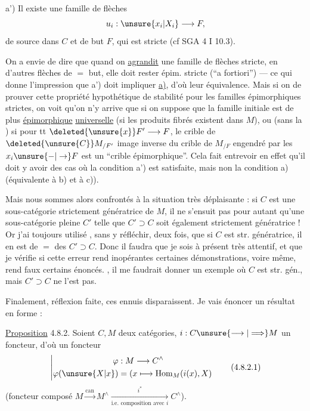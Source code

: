 a') Il existe une famille de flèches
\[
u_i:\unsure{x_i|X_i}\longrightarrow F,
\]
de source dans $C$ et
de but $F$, qui est 
stricte (cf SGA 4 I 10.3).

On a envie de dire que quand on \uline{agrandit}
une famille de flèches 
stricte, en   d'autres flèches de
$=$ but, elle doit rester épim.
stricte (``a fortiori'') --- ce qui donne
l'impression que a') doit impliquer \uline{a)},
d'où leur  équivalence. Mais si on  de prouver cette propriété hypothétique 
de stabilité pour les familles épimorphiques
strictes, on voit qu'on n'y arrive que
si on suppose que la famille initiale
est de plus \uline{épimorphique} \uline{universelle}
(si les produits fibrés existent dans $M$),
ou (sans la  ) si  pour
tt $\deleted{\unsure{x}}F'\longrightarrow F$, le crible de $\deleted{\unsure{C}}M_{/F'}$ image
inverse du crible de $M_{/F}$ engendré par
les $x_i\unsure{\mathord{-}|\to}F$ est un ``crible épimorphique''.
 Cela fait entrevoir en effet qu'il doit
y avoir des cas où la condition a') est
satisfaite, mais non la condition a)
(équivalente à b) et à c)).

Mais nous sommes alors confrontés
à la situation très déplaisante : si $C$ est
une sous-catégorie strictement génératrice de
$M$, il ne s'ensuit pas pour autant qu'une
sous-catégorie pleine $C'$   telle que $C'\supset C$
soit également strictement génératrice !
Or j'ai toujours utilisé , sans y réfléchir,
deux fois, que si $C$ est  str. génératrice,
il en est de $=$ des $C'\supset C$. Donc il
faudra que je sois à présent très attentif,
et que je vérifie si cette erreur 
 rend inopérantes certaines
démonstrations, voire même, rend faux certains
énoncés. , il me faudrait donner
un exemple où $C$ est str. gén., mais
$C'\supset C$ ne l'est pas.

Finalement, réflexion faite, ces ennuis 
disparaissent. Je vais énoncer un résultat
en forme :

\uline{Proposition} 4.8.2. Soient $C,M$ deux catégories,
$i:C\unsure{\longrightarrow|\Longrightarrow} M$ un foncteur, d'où un
foncteur
\[
\left|\begin{aligned}
\varphi &: M\longrightarrow C^\wedge\\
\varphi(\unsure{X|x})&=(x\longmapsto\operatorname{Hom}_M(i(x),X)
\end{aligned}\right.
\tag*{(4.8.2.1)}
\]
(foncteur composé $M\xrightarrow{\mathrm{can}}M^\wedge
\xrightarrow[\text{i.e. composition avec }i]{i^*}C^\wedge$).

